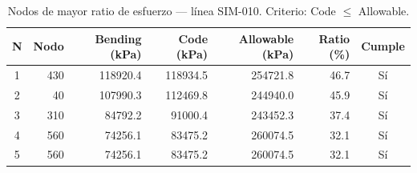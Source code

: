 \begin{table}[htbp]
  \centering
  \small
  \caption{Nodos de mayor ratio de esfuerzo — línea SIM-010. Criterio: Code $\leq$ Allowable.}
  \label{tab:top5-ratio}
  \begin{tabular}{crrrrrc}
    \toprule
    N & Nodo & Bending (\si{kPa}) & Code (\si{kPa}) & Allowable (\si{kPa}) & Ratio (\%) & Cumple \\
    \midrule
    1 & 430 & \num{118920.4} & \num{118934.5} & \num{254721.8} & 46.7 & Sí \\
    2 & 40 & \num{107990.3} & \num{112469.8} & \num{244940.0} & 45.9 & Sí \\
    3 & 310 & \num{84792.2} & \num{91000.4} & \num{243452.3} & 37.4 & Sí \\
    4 & 560 & \num{74256.1} & \num{83475.2} & \num{260074.5} & 32.1 & Sí \\
    5 & 560 & \num{74256.1} & \num{83475.2} & \num{260074.5} & 32.1 & Sí \\
    \bottomrule
  \end{tabular}
\end{table}
